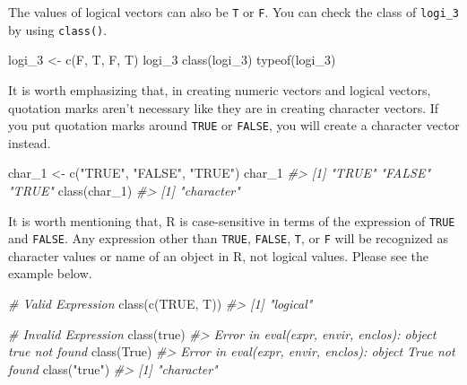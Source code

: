 \documentclass[
]{book}
\newenvironment{Shaded}{\begin{snugshade}}{\end{snugshade}}
\newcommand{\CommentTok}[1]{\textcolor[rgb]{0.56,0.35,0.01}{\textit{#1}}}
\newcommand{\ConstantTok}[1]{\textcolor[rgb]{0.00,0.00,0.00}{#1}}
\newcommand{\FunctionTok}[1]{\textcolor[rgb]{0.00,0.00,0.00}{#1}}
\newcommand{\NormalTok}[1]{#1}
\newcommand{\OtherTok}[1]{\textcolor[rgb]{0.56,0.35,0.01}{#1}}
\newcommand{\StringTok}[1]{\textcolor[rgb]{0.31,0.60,0.02}{#1}}
\newenvironment{blackbox}{
  \definecolor{shadecolor}{rgb}{0, 0, 0}  %
  \color{white}
  \begin{shaded}}
 {\end{shaded}}
\newenvironment{infobox}[1]
  {
  \begin{itemize}
  \renewcommand{\labelitemi}{
    \raisebox{-.7\height}[0pt][0pt]{
      {\setkeys{Gin}{width=3em,keepaspectratio}
        \texttt{[image: pics/\#1]}}
    }
  }
  \setlength{\fboxsep}{1em}
  \begin{blackbox}
  \item
  }
  {
  \end{blackbox}
  \end{itemize}
  }
\begin{document}
The values of logical vectors can also be \texttt{T} or \texttt{F}. You can check the class of \texttt{logi\_3} by using \texttt{class()}.

\begin{Shaded}
\begin{Highlighting}[]
\NormalTok{logi\_3 }\OtherTok{\textless{}{-}} \FunctionTok{c}\NormalTok{(F, T, F, T)}
\NormalTok{logi\_3}
\FunctionTok{class}\NormalTok{(logi\_3)}
\FunctionTok{typeof}\NormalTok{(logi\_3)}
\end{Highlighting}
\end{Shaded}

\begin{infobox}{caution}

It is worth emphasizing that, in creating numeric vectors and logical vectors, quotation marks aren't necessary like they are in creating character vectors. If you put quotation marks around \texttt{TRUE} or \texttt{FALSE}, you will create a character vector instead.

\begin{Shaded}
\begin{Highlighting}[]
\NormalTok{char\_1 }\OtherTok{\textless{}{-}} \FunctionTok{c}\NormalTok{(}\StringTok{"TRUE"}\NormalTok{, }\StringTok{"FALSE"}\NormalTok{, }\StringTok{"TRUE"}\NormalTok{)}
\NormalTok{char\_1}
\CommentTok{\#\textgreater{} [1] "TRUE"  "FALSE" "TRUE"}
\FunctionTok{class}\NormalTok{(char\_1)}
\CommentTok{\#\textgreater{} [1] "character"}
\end{Highlighting}
\end{Shaded}

\end{infobox}

It is worth mentioning that, R is case-sensitive in terms of the expression of \texttt{TRUE} and \texttt{FALSE}. Any expression other than \texttt{TRUE}, \texttt{FALSE}, \texttt{T}, or \texttt{F} will be recognized as character values or name of an object in R, not logical values. Please see the example below.

\begin{Shaded}
\begin{Highlighting}[]
\CommentTok{\# Valid Expression }
\FunctionTok{class}\NormalTok{(}\FunctionTok{c}\NormalTok{(}\ConstantTok{TRUE}\NormalTok{, T))}
\CommentTok{\#\textgreater{} [1] "logical"}

\CommentTok{\# Invalid Expression}
\FunctionTok{class}\NormalTok{(true)}
\CommentTok{\#\textgreater{} Error in eval(expr, envir, enclos): object \textquotesingle{}true\textquotesingle{} not found}
\FunctionTok{class}\NormalTok{(True)}
\CommentTok{\#\textgreater{} Error in eval(expr, envir, enclos): object \textquotesingle{}True\textquotesingle{} not found}
\FunctionTok{class}\NormalTok{(}\StringTok{"true"}\NormalTok{)}
\CommentTok{\#\textgreater{} [1] "character"}
\end{Highlighting}
\end{Shaded}
\end{document}
